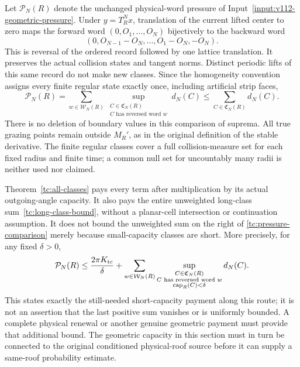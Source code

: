 Let $\mathcal P_N(R)$ denote the unchanged physical-word pressure
of Input~\ref{input:v112-geometric-pressure}.  Under $y=T_R^Nx$,
translation of the current lifted center to zero maps the forward
word $(0,O_1,\ldots,O_N)$ bijectively to the backward word
\[
 (0,O_{N-1}-O_N,\ldots,O_1-O_N,-O_N).
\]
This is reversal of the ordered record followed by one lattice
translation.  It preserves the actual collision states and tangent
norms.  Distinct periodic lifts of this same record do not make
new classes.  Since the homogeneity convention assigns every
finite regular state exactly once, including artificial strip faces,
\begin{equation}\label{tc:pressure-comparison}
 \mathcal P_N(R)
   =\sum_{w\in\mathcal W_N(R)}
        \sup_{\substack{C\in\mathfrak C_N(R)\\
                         C\text{ has reversed word }w}}d_N(C)
   \le\sum_{C\in\mathfrak C_N(R)}d_N(C).
\end{equation}
There is no deletion of boundary values in this comparison of
suprema.  All true grazing points remain outside $M_R'$, as in
the original definition of the stable derivative.  The finite
regular classes cover a full collision-measure set for each fixed
radius and finite time; a common null set for uncountably many
radii is neither used nor claimed.

Theorem~\ref{tc:all-classes} pays every term after multiplication
by its actual outgoing-angle capacity.  It also pays the entire
unweighted long-class sum~\eqref{tc:long-class-bound}, without a
planar-cell intersection or continuation assumption.  It does not
bound the unweighted sum on the right of
\eqref{tc:pressure-comparison} merely because small-capacity
classes are short.  More precisely, for any fixed $\delta>0$,
\begin{equation}\label{tc:remaining-pressure-interface}
 \mathcal P_N(R)\le {2\pi K_{\rm tc}\over\delta}
   +\sum_{w\in\mathcal W_N(R)}
       \sup_{\substack{C\in\mathfrak C_N(R)\\
                C\text{ has reversed word }w\\
                \operatorname{cap}_R(C)<\delta}}d_N(C).
\end{equation}
This states exactly the still-needed short-capacity payment along
this route; it is not an assertion that the last positive sum
vanishes or is uniformly bounded.  A complete physical renewal
or another genuine geometric payment must provide that additional
bound.  The geometric capacity in this section must in turn be
connected to the original conditioned physical-roof source before
it can supply a same-roof probability estimate.

